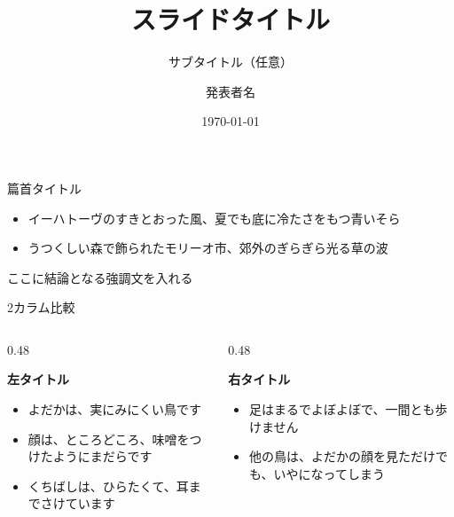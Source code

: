 \documentclass[aspectratio=169,unicode]{beamer}
\title{スライドタイトル}
\subtitle{サブタイトル（任意）}
\author{発表者名}
\date{\today}
\begin{document}
\begin{frame}
  \titlepage
\end{frame}

\begin{frame}{篇首タイトル}
  \begin{itemize}
    \item イーハトーヴのすきとおった風、夏でも底に冷たさをもつ青いそら
    \item うつくしい森で飾られたモリーオ市、郊外のぎらぎら光る草の波
  \end{itemize}
  \vspace{0.4em}
  \begin{center}
  \end{center}
  \begin{tuthighlight}
    ここに結論となる強調文を入れる
  \end{tuthighlight}
\end{frame}

\begin{frame}{2カラム比較}
  \begin{columns}[T]
    \begin{column}{0.48\textwidth}
      \begin{center}\textbf{左タイトル}\end{center}
      \begin{itemize}
        \item よだかは、実にみにくい鳥です
        \item 顔は、ところどころ、味噌をつけたようにまだらです
        \item くちばしは、ひらたくて、耳までさけています
      \end{itemize}
    \end{column}
    \begin{column}{0.48\textwidth}
      \begin{center}\textbf{右タイトル}\end{center}
      \begin{itemize}
        \item 足はまるでよぼよぼで、一間とも歩けません
        \item 他の鳥は、よだかの顔を見ただけでも、いやになってしまう
      \end{itemize}
    \end{column}
  \end{columns}
\end{frame}
\end{document}
